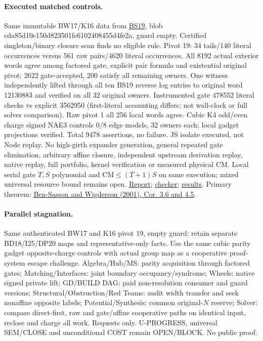 \documentclass[11pt]{article}
\begin{document}
\paragraph{Executed matched controls.}
Same immutable BW17/K16 data from \href{https://github.com/j15marti/pnp/commit/ff92a1c3d44e4b48dc9a7bf215825075396cae5a}{BS19}, blob cda85d10e150d823501fe6102408455d4fe2a, guard empty. Certified singleton/binary closure scan finds no eligible rule. Pivot 19: 34 tails/140 literal occurrences versus 561 raw pairs/4620 literal occurrences. All 8192 actual exterior words agree among factored gate, explicit pair formula and existential original pivot; 2622 gate-accepted, 200 satisfy all remaining owners. One witness independently lifted through all ten BS19 reverse log entries to original word 12130883 and verified on all 32 original owners. Instrumented gate 478552 literal checks vs explicit 3562950 (first-literal accounting differs; not wall-clock or full solver comparison). Raw pivot 1 all 256 local words agree. Cubic K4 odd/even charge signed NAE3 controls 0/8 edge models, 32 owners each; local gadget projections verified. Total 9478 assertions, no failure. JS isolate executed, not Node replay. No high-girth expander generation, general repeated gate elimination, arbitrary affine closure, independent upstream derivation replay, native replay, full portfolio, kernel verification or measured physical CM. Local serial gate $T,S$ polynomial and $\mathrm{CM}\le(T+1)S$ on same execution; mixed universal resource bound remains open. \href{https://github.com/j15marti/pnp/commit/10fde14cfb951d7a26643b9000eff3d5300a817a}{Report}; \href{https://github.com/j15marti/pnp/commit/62d5c18ab8b71ee581b85a63656f26b83a42a436}{checker}; \href{https://github.com/j15marti/pnp/commit/e5556e14e97c74b3beae1897772896c94f4a1f04}{results}. Primary theorem: \href{https://people.inf.ethz.ch/emo/SatSem05/Papers/BensassonWidgerson01.pdf}{Ben-Sasson and Wigderson (2001), Cor. 3.6 and 4.5}.
 
\paragraph{Parallel stagnation.}
Same authenticated BW17 and K16 pivot 19, empty guard; retain separate BD18/I25/DP20 maps and representative-only facts. Use the same cubic parity gadget opposite-charge controls with actual group map as a cooperative proof-system escape challenge. Algebra/Hub/MS: parity acquisition through factored gates; Matching/Interfaces: joint boundary occupancy/syndrome; Wheels: native signed private lift; GD/BUILD DAG: paid non-resolution consumer and guard versions; Structural/Obstruction/Red Teams: audit width transfer and seek nonaffine opposite labels; Potential/Synthesis: common original-$N$ reserve; Solver: compare direct-first, raw and gate/affine cooperative paths on identical input, reclose and charge all work. Requests only. U-PROGRESS, universal SEM/CLOSE and unconditional COST remain OPEN/BLOCK. No public proof.
\end{document}
